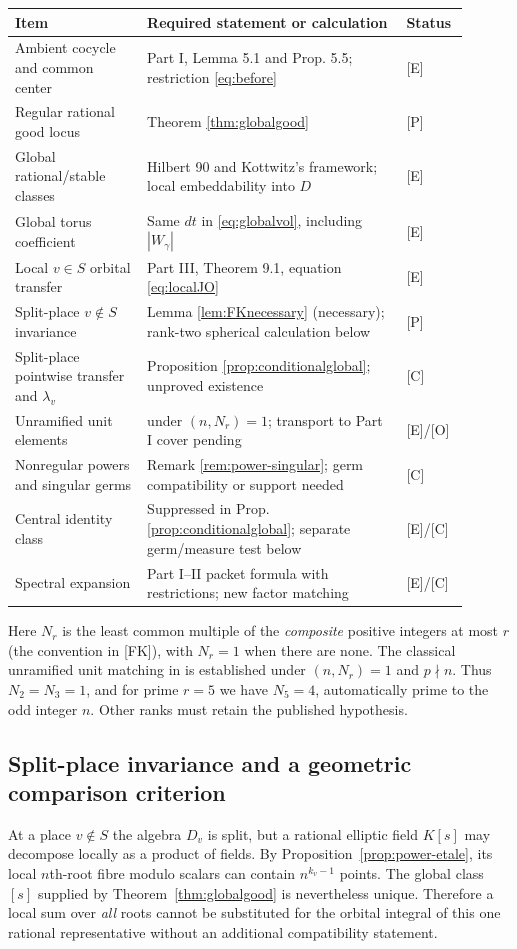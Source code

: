 \documentclass[11pt]{article}
\theoremstyle{plain}
\theoremstyle{definition}
\begin{document}
\begin{center}\small
\begin{longtable}{@{}p{0.27\linewidth}p{0.53\linewidth}p{0.10\linewidth}@{}}
\toprule
Item & Required statement or calculation & Status\\\midrule
\endhead
Ambient cocycle and common center & Part I, Lemma 5.1 and Prop. 5.5; restriction \eqref{eq:before} & [E]\\
Regular rational good locus & Theorem \ref{thm:globalgood} & [P]\\
Global rational/stable classes & Hilbert 90 and Kottwitz's framework; local embeddability into $D$ & [E]\\
Global torus coefficient & Same $dt$ in \eqref{eq:globalvol}, including $|W_\gamma|$ & [E]\\
Local $v\in S$ orbital transfer & Part III, Theorem 9.1, equation \eqref{eq:localJO} & [E]\\
Split-place $v\notin S$ invariance & Lemma \ref{lem:FKnecessary} (necessary); rank-two spherical calculation below & [P]\\
Split-place pointwise transfer and $\lambda_v$ & Proposition \ref{prop:conditionalglobal}; unproved existence & [C]\\
Unramified unit elements & \cite[\S\S11--12]{FK} under $(n,N_r)=1$; transport to Part I cover pending & [E]/[O]\\
Nonregular powers and singular germs & Remark \ref{rem:power-singular}; germ compatibility or support needed & [C]\\
Central identity class & Suppressed in Prop. \ref{prop:conditionalglobal}; separate germ/measure test below & [E]/[C]\\
Spectral expansion & Part I--II packet formula with restrictions; new factor matching & [E]/[C]\\
\bottomrule
\end{longtable}
\end{center}
Here $N_r$ is the least common multiple of the \emph{composite}
positive integers at most $r$ (the convention in [FK]), with $N_r=1$
when there are none.  The classical unramified unit matching in
\cite[\S12, Corollary]{FK} is established under $(n,N_r)=1$
and $p\nmid n$.  Thus $N_2=N_3=1$, and for prime $r=5$
we have $N_5=4$, automatically prime to the odd integer $n$.
Other ranks must retain the published hypothesis.

\subsection{Split-place invariance and a geometric comparison criterion}
At a place $v\notin S$ the algebra $D_v$ is split, but a rational
elliptic field $K[s]$ may decompose locally as a product of fields.
By Proposition~\ref{prop:power-etale}, its local $n$th-root fibre
modulo scalars can contain $n^{k_v-1}$ points.  The global class
$[s]$ supplied by Theorem~\ref{thm:globalgood} is nevertheless
unique.  Therefore a local sum over \emph{all} roots cannot be substituted
for the orbital integral of this one rational representative without
an additional compatibility statement.
\end{document}
